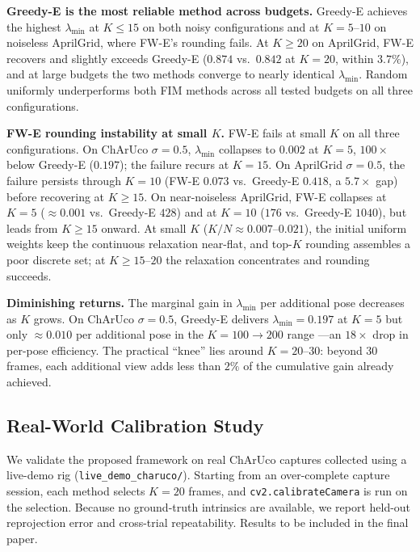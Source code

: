 \documentclass[11pt]{article}
\begin{document}
\noindent\textbf{Greedy-E is the most reliable method across budgets.}
Greedy-E achieves the highest $\lambda_{\min}$ at $K{\le}15$ on both noisy
configurations and at $K{=}5$--$10$ on noiseless AprilGrid, where FW-E's
rounding fails.
At $K{\ge}20$ on AprilGrid, FW-E recovers and slightly exceeds Greedy-E
($0.874$ vs.\ $0.842$ at $K{=}20$, within $3.7\%$), and at large budgets the
two methods converge to nearly identical $\lambda_{\min}$.
Random uniformly underperforms both FIM methods across all tested budgets on
all three configurations.

\noindent\textbf{FW-E rounding instability at small $K$.}
FW-E fails at small $K$ on all three configurations.
On ChArUco $\sigma{=}0.5$, $\lambda_{\min}$ collapses to $0.002$ at $K{=}5$,
$100{\times}$ below Greedy-E ($0.197$); the failure recurs at $K{=}15$.
On AprilGrid $\sigma{=}0.5$, the failure persists through $K{=}10$
(FW-E $0.073$ vs.\ Greedy-E $0.418$, a $5.7{\times}$ gap) before recovering
at $K{\ge}15$.
On near-noiseless AprilGrid, FW-E collapses at $K{=}5$ (${\approx}0.001$ vs.\
Greedy-E $428$) and at $K{=}10$ ($176$ vs.\ Greedy-E $1040$), but leads from
$K{\ge}15$ onward.
At small $K$ ($K/N{\approx}0.007$--$0.021$), the initial uniform weights keep
the continuous relaxation near-flat, and top-$K$ rounding assembles a poor
discrete set; at $K{\ge}15$--$20$ the relaxation concentrates and rounding
succeeds.

\noindent\textbf{Diminishing returns.}
The marginal gain in $\lambda_{\min}$ per additional pose decreases as $K$
grows.
On ChArUco $\sigma{=}0.5$, Greedy-E delivers $\lambda_{\min}{=}0.197$ at $K{=}5$
but only ${\approx}0.010$ per additional pose in the $K{=}100\!\to\!200$ range
---an $18{\times}$ drop in per-pose efficiency.
The practical ``knee'' lies around $K{=}20$--$30$: beyond 30 frames, each
additional view adds less than $2\%$ of the cumulative gain already achieved.

\subsection{Real-World Calibration Study}
\label{subsec:real_world}

We validate the proposed framework on real ChArUco captures collected using
a live-demo rig (\texttt{live\_demo\_charuco/}).
Starting from an over-complete capture session, each method selects $K{=}20$
frames, and \texttt{cv2.calibrateCamera} is run on the selection.
Because no ground-truth intrinsics are available, we report held-out
reprojection error and cross-trial repeatability.
Results to be included in the final paper.

\printbibliography
\end{document}
